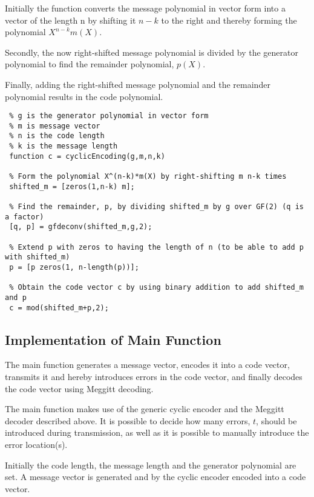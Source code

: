 \documentclass[Main]{subfiles}
\begin{document}
\noindent Initially the function converts the message polynomial in vector form into a vector of the length n by shifting it $n-k$ to the right and thereby forming the polynomial $X^{n-k}m(X)$. 

\noindent Secondly, the now right-shifted message polynomial is divided by the generator polynomial to find the remainder polynomial, $p(X)$.

\noindent Finally, adding the right-shifted message polynomial and the remainder polynomial results in the code polynomial.  

\begin{lstlisting}[caption=Cyclic Encoder, style=Code-Matlab, label=lst:refID]
 % cyclicEncoding is a function that encodes a message vector into systematic code given the following parameters
 % g is the generator polynomial in vector form
 % m is message vector
 % n is the code length
 % k is the message length
 function c = cyclicEncoding(g,m,n,k)

 % Form the polynomial X^(n-k)*m(X) by right-shifting m n-k times 
 shifted_m = [zeros(1,n-k) m];

 % Find the remainder, p, by dividing shifted_m by g over GF(2) (q is a factor)
 [q, p] = gfdeconv(shifted_m,g,2);

 % Extend p with zeros to having the length of n (to be able to add p with shifted_m)
 p = [p zeros(1, n-length(p))];

 % Obtain the code vector c by using binary addition to add shifted_m and p 
 c = mod(shifted_m+p,2);
\end{lstlisting}

\subsection{Implementation of Main Function}
The main function generates a message vector, encodes it into a code vector, transmits it and hereby introduces errors in the code vector, and finally decodes the code vector using Meggitt decoding.

\noindent The main function makes use of the generic cyclic encoder and the Meggitt decoder described above. It is possible to decide how many errors, $t$, should be introduced during transmission, as well as it is possible to manually introduce the error location(s).

\noindent Initially the code length, the message length and the generator polynomial are set. A message vector is generated and by the cyclic encoder encoded into a code vector. 
\end{document}
